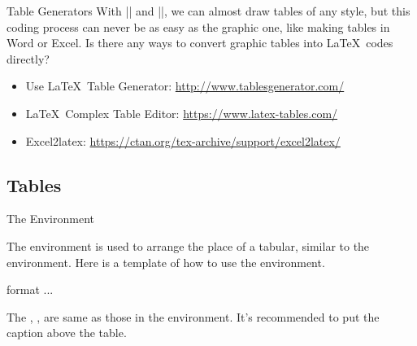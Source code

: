 \begin{frame}[fragile]{Table Generators}
	With \LC|\multirow| and \LC|\multicolumn|, we can almost draw tables of any style, but this coding process can never be as easy as the graphic one, like making tables in Word or Excel. Is there any ways to convert graphic tables into \LaTeX\ codes directly?\\
	\begin{itemize}
		\item Use \LaTeX\ Table Generator: \url{http://www.tablesgenerator.com/}
		\item \LaTeX\ Complex Table Editor: \url{https://www.latex-tables.com/}
		\item Excel2latex: \url{https://ctan.org/tex-archive/support/excel2latex/}
	\end{itemize}
\end{frame}

\subsection{Tables}

\begin{frame}[fragile]{The  Environment}

The  environment is used to arrange the place of a tabular, similar to the  environment. Here is a template of how to use the environment.

\begin{command}
\begin{LCL}
\begin{table}[position]
  \centering
  \caption{caption}
  \begin{tabular}{format}
    ...
  \end{tabular}
  \label{table:label}
\end{table}
\end{LCL}
\end{command}

The , ,  are same as those in the  environment.
It's recommended to put the caption above the table.
\end{frame}

